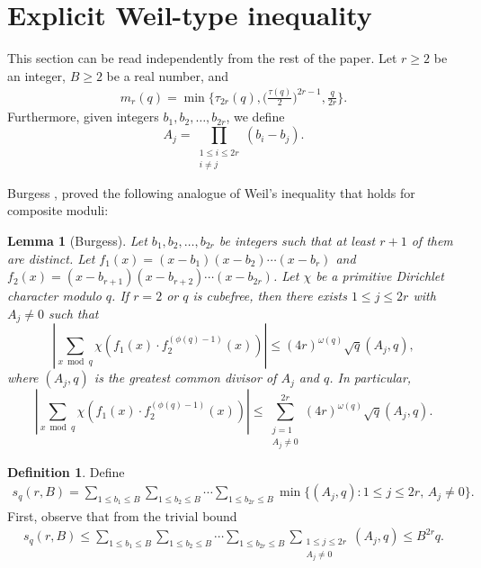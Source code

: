 \documentclass[12pt]{amsart}
\theoremstyle{plain}
\newtheorem{lemma}[theorem]{Lemma}
\theoremstyle{definition}
\newtheorem{definition}[theorem]{Definition}
\begin{document}
\section{Explicit Weil-type inequality}\label{sec: weil}
This section can be read independently from the rest of the paper. Let $r\ge 2$ be an integer, $B\ge 2$ be a real number, and \begin{align}\label{meet fake mrq}
    m_r(q) = \min \biggl\{ \tau_{2r}(q), \biggl( \frac{\tau(q)}2 \biggr)^{2r-1} , \frac{q}{2r} \biggr\}.
\end{align} 
Furthermore, given integers $b_1, b_2, \dots,b_{2r}$, we define 
$$A_j= \displaystyle\prod_{\substack{1\le i\le 2r\\i\ne j}}\left(b_i - b_j\right).$$

Burgess \cite[Lemma 7]{burgess:1962}, \cite[Lemma 8]{Bur1963} proved the following analogue of Weil's inequality that holds for composite moduli:

\begin{lemma}[Burgess]\label{burgess weil}
 Let $b_1,b_2,\ldots,b_{2r}$ be integers such that at least $r+1$ of them are distinct. Let $f_1(x) = (x-b_1)(x-b_2)\cdots(x-b_r)$ and $f_2(x) = (x-b_{r+1})(x-b_{r+2})\cdots (x-b_{2r})$. Let $\chi$ be a primitive Dirichlet character modulo $q$. If $r=2$ or $q$ is cubefree, then there exists $1\le j\le 2r$ with $A_j\ne 0$ such that
 $$\left|\sum_{x\bmod{q}}\chi(f_1(x)\cdot f_2^{(\phi(q)-1)}(x))\right|\le (4r)^{\omega(q)}\sqrt{q}(A_j,q),$$
 where $(A_j,q)$ is the greatest common divisor of $A_j$ and $q$.
 In particular, 
 $$\left|\sum_{x\bmod{q}}\chi(f_1(x)\cdot f_2^{(\phi(q)-1)}(x))\right|\le \sum_{\substack{j=1\\A_j\ne 0}}^{2r}(4r)^{\omega(q)}\sqrt{q}(A_j,q).$$
 
\end{lemma}

\begin{definition} \label{def sq(r)}
Define
    \begin{align*}
      s_q(r,B) = \sum_{1\le b_1\le B}\sum_{1\le b_2\le B}\cdots\sum_{1\le b_{2r}\le B}
      \min\bigl\{ (A_j, q)\colon 1\le j\le 2r,\, A_j\ne0 \bigr\}.
    \end{align*}
First, observe that from the trivial bound
\begin{align*}
     s_q(r,B)\le \sum_{1\le b_1\le B}\sum_{1\le b_2\le B}\cdots\sum_{1\le b_{2r}\le B}
      \sum_{\substack{1\le j\le 2r\\A_j\ne0}}\left(A_j, q\right)\le B^{2r}q.
\end{align*}
\end{definition}
\end{document}
